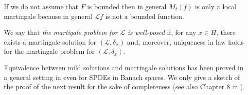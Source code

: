 \documentclass[preprint]{imsart}
\def\L{\mathcal L}
\begin{document}
  If we do not assume that $F$ is bounded then in general    
   $M_t(f)$ is only a local martingale because   in general  $\L f$ is not    a bounded function.

 \smallskip 
  We say that \textsl{ the martigale problem for ${ \L}$ is  well-posed} if, for any $x  \in H$,   there exists a martingale solution
 for $({ \L}, \delta_x)$ and, moreover,  uniqueness in law    holds  for  the martingale problem for $({ \L}, \delta_x)$. 
 
 
 
  Equivalence between 
    mild solutions and martingale solutions  has been proved in a  general setting  in  \cite{kunze} even for SPDEs in Banach spaces.   
  We only give a sketch of the proof of  the next result for the sake of completeness
  (see also Chapter 8 in \cite{DZ}). 
  
   
   
    
  
  
\end{document}
